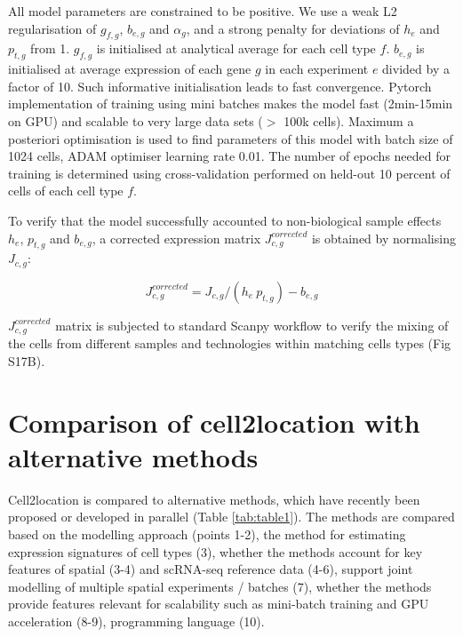 \documentclass[11pt,a4paper]{article}
\begin{document}
\begin{enumerate}
    All model parameters are constrained to be positive. We use a weak L2 regularisation of $g_{f,g}$, $b_{e,g}$ and $\alpha_g$, and a strong penalty for deviations of $h_e$ and $p_{t,g}$ from 1. $g_{f,g}$ is initialised at analytical average for each cell type $f$. $b_{e,g}$ is initialised at average expression of each gene $g$ in each experiment $e$ divided by a factor of 10. Such informative initialisation leads to fast convergence.  \newline
    Pytorch implementation of training using mini batches makes the model fast (2min-15min on GPU) and scalable to very large data sets ($>$ 100k cells). Maximum a posteriori optimisation is used to find parameters of this model with batch size of 1024 cells, ADAM optimiser learning rate 0.01. The number of epochs needed for training is determined using cross-validation performed on held-out 10 percent of cells of each cell type $f$. \newline
    
    To verify that the model successfully accounted to non-biological sample effects $h_e$, $p_{t,g}$ and $b_{e,g}$, a corrected expression matrix $J^{corrected}_{c,g}$ is obtained by normalising $J_{c,g}$:
    \begin{linenomath*} \begin{equation} \label{eq:c2l_ref_prog:3}
    J^{corrected}_{c,g} = J_{c,g} / ({h_e} \: p_{t,g}) - b_{e,g}
    \end{equation} \end{linenomath*}
    $J^{corrected}_{c,g}$ matrix is subjected to standard Scanpy workflow \autocite{wolf_scanpy_2018} to verify the mixing of the cells from different samples and technologies within matching cells types (Fig S17B).

\end{enumerate}

\section{Comparison of cell2location with alternative methods} \label{comparison_of_c2l_to_other}
Cell2location is compared to alternative methods, which have recently been proposed or developed in parallel (Table \ref{tab:table1}). The methods are compared based on the modelling approach (points 1-2), the method for estimating expression signatures of cell types (3), whether the methods account for key features of spatial (3-4) and scRNA-seq reference data (4-6), support joint modelling of multiple spatial experiments / batches (7), whether the methods provide features relevant for scalability such as mini-batch training and GPU acceleration (8-9), programming language (10).
\end{document}
